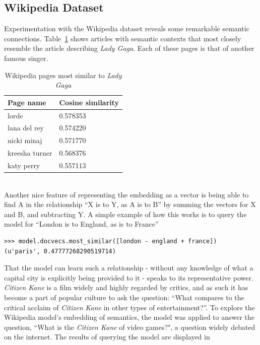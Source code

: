 \documentclass[11pt]{article}
\begin{document}
\subsection*{Wikipedia Dataset}
Experimentation with the Wikipedia dataset reveals some remarkable
semantic connections. Table~\ref{tab:ladygaga} shows articles with semantic
contexts that most closely resemble the article describing \emph{Lady Gaga}.
Each of these pages is that of another famous singer.
\begin{table}[h]
  \begin{center}
    \begin{tabular}{l l}
      Page name & Cosine similarity\\
      \hline
      lorde & 0.578353\\
      lana del rey & 0.574220\\
      nicki minaj & 0.571770\\
      kreesha turner & 0.568376\\
      katy perry & 0.557113\\
    \end{tabular}
  \caption{Wikipedia pages most similar to \emph{Lady Gaga}}
  \label{tab:ladygaga}
  \end{center}
\end{table}
\\Another nice feature of representing the embedding as a vector is being able to find
A in the relationship ``X is to Y, as A is to B'' by summing the vectors for X
and B, and subtracting Y.
A simple example of how this works is to query the model for
``London is to England, as \underline{\hspace{30pt}} is to France''
\begin{verbatim}
>>> model.docvecs.most_similar([london - england + france])
(u'paris', 0.47777268290519714)
\end{verbatim}
That the model can learn such a relationship - without any knowledge of what a
capital city is explicitly being provided to it - speaks to its representative
power.\\
\emph{Citizen Kane} is a film widely and highly regarded by critics, and as such
it has become a part of popular culture to ask the question:
``What compares to the critical acclaim of \emph{Citizen Kane}
in other types of entertainment?''. To explore the Wikipedia model's embedding
of semantics, the model was applied to answer the question,
``What is the \emph{Citizen Kane} of video games?", a question widely debated
on the internet. The results of querying the model are displayed in
\end{document}
